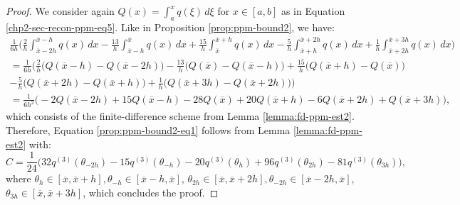 \begin{proof}
	We consider again $Q(x) = \int_{a}^{x} q(\xi) \,d\xi$ for $x \in [a,b]$ as in 
	Equation \eqref{chp2-sec-recon-ppm-eq5}. 
	Like in Proposition \ref{prop:ppm-bound2}, we have:
	\begin{align*}
	\frac{1}{6h}
	\bigg( \frac{2}{h} \int_{\overline{x}-2h}^{\overline{x}-h} q(x) \,dx 
		      -\frac{13}{h}\int_{\overline{x}-h}^{\overline{x}} q(x) \,dx   
		      +\frac{15}{h}\int_{\overline{x}}^{\overline{x}+h} q(x) \,dx 
		      -\frac{5}{h} \int_{\overline{x}+h}^{\overline{x}+2h} q(x) \,dx   
		      +\frac{1}{h} \int_{\overline{x}+2h}^{\overline{x}+3h} q(x) \,dx   
		\bigg)\\
		= \frac{1}{6h} \bigg(
		\frac{2}{h}   \big( Q(\overline{x}-h)- Q(\overline{x}-2h)\big) 
		-\frac{13}{h} \big( Q(\overline{x}) - Q(\overline{x}-h) \big) 
		+\frac{15}{h} \big( Q(\overline{x}+h) - Q(\overline{x})  \big) \\
		-\frac{5}{h}  \big( Q(\overline{x}+2h) - Q(\overline{x}+h)  \big) 
		+\frac{1}{h}  \big( Q(\overline{x}+3h) - Q(\overline{x}+2h)  \big) 
		\bigg)\\
		= \frac{1}{6h^2}\bigg(-2Q(\overline{x}-2h) + 15Q(\overline{x}-h) - 28Q(\overline{x}) 
		+20Q(\overline{x}+h) -6Q(\overline{x}+2h) + Q(\overline{x}+3h)  \bigg),
	\end{align*}
	which consists of the finite-difference scheme from Lemma \ref{lemma:fd-ppm-est2}. 
	Therefore, Equation \eqref{prop:ppm-bound2-eq1} follows from 
	Lemma \ref{lemma:fd-ppm-est2} with:
	\begin{equation}
		\label{prop:ppm-bound2-eq2}
		C = \frac{1}{24}\bigg(32q^{(3)}(\theta_{-2h}) - 15q^{(3)}(\theta_{-h}) -20q^{(3)}(\theta_{h}) +96 q^{(3)}(\theta_{2h}) - 81q^{(3)}(\theta_{3h})\bigg), 
	\end{equation}
	where $\theta_{h} \in [\overline{x},\overline{x}+h], \theta_{-h}\in [\overline{x}-h,\overline{x}]$, 
	$\theta_{2h} \in [\overline{x},\overline{x}+2h], \theta_{-2h}\in [\overline{x}-2h,\overline{x}]$,
	$\theta_{3h} \in [\overline{x},\overline{x}+3h]$,
	which concludes the proof.

\end{proof}

